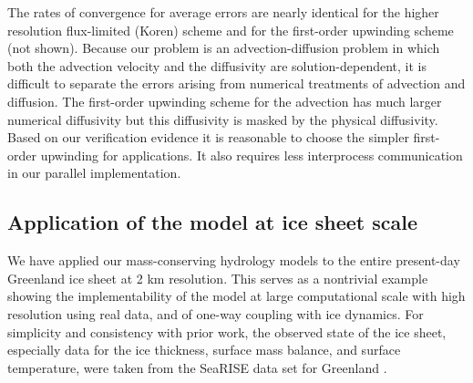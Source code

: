 \documentclass[gmd]{copernicus}   %
\begin{document}
The rates of convergence for average errors are nearly identical for the higher resolution flux-limited (Koren) scheme and for the first-order upwinding scheme (not shown).  Because our problem is an advection-diffusion problem in which both the advection velocity and the diffusivity are solution-dependent, it is difficult to separate the errors arising from numerical treatments of advection and diffusion.  The first-order upwinding scheme for the advection has much larger numerical diffusivity but this diffusivity is masked by the physical diffusivity.  Based on our verification evidence it is reasonable to choose the simpler first-order upwinding for applications.  It also requires less interprocess communication in our parallel implementation.


\subsection{Application of the model at ice sheet scale}

We have applied our mass-conserving hydrology models to the entire present-day Greenland ice sheet at 2 km resolution.  This serves as a nontrivial example showing the implementability of the model at large computational scale with high resolution using real data, and of one-way coupling with ice dynamics.  For simplicity and consistency with prior work, the observed state of the ice sheet, especially data for the ice thickness, surface mass balance, and surface temperature, were taken from the SeaRISE data set for Greenland \cite[and references therein]{Bindschadler2013SeaRISE,Nowicki2013GreenlandSeaRISE}.

\newcommand{\grnht}{3.8in}
\end{document}
